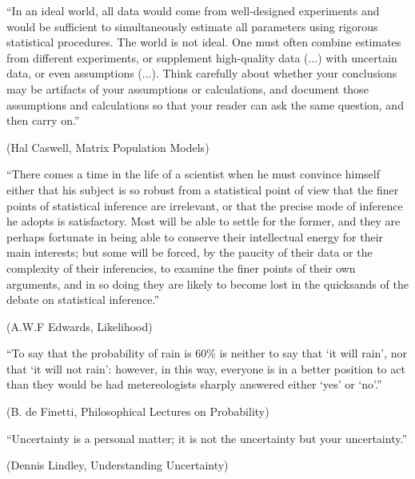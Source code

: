 
\cleardoublepage
\null
\vfill

``In an ideal world, all data would come from well-designed experiments
and would be sufficient to simultaneously estimate all parameters using rigorous
statistical procedures. The world is not ideal. One must often combine estimates
from different experiments, or supplement high-quality data (...) with uncertain
data, or even assumptions (...). Think carefully about whether your conclusions
may be artifacts of your assumptions or calculations, and document those assumptions
and calculations so that your reader can ask the same question, and then carry on.''
\begin{flushright}
(Hal Caswell, Matrix Population Models)
\end{flushright}

\vfill

``There comes a time in the life of a scientist when he must convince himself
either that his subject is so robust from a statistical point of view that
the finer points of statistical inference are irrelevant, or that the precise
mode of inference he adopts is satisfactory. Most will be able to settle for
the former, and they are perhaps fortunate in being able to conserve their
intellectual energy for their main interests; but some will be forced, by the
paucity of their data or the complexity of their inferencies, to examine
the finer points of their own arguments, and in so doing they are likely
to become lost in the quicksands of the debate on statistical inference.''
\begin{flushright}
(A.W.F Edwards, Likelihood)
\end{flushright}

\vfill

``To say that the probability of rain is 60\% is neither to say that
`it will rain', nor that `it will not rain': however, in this way,
everyone is in a better position to act than they would be had
metereologists sharply answered either `yes' or `no'.''
\begin{flushright}
(B. de Finetti, Philosophical Lectures on Probability)
\end{flushright}

\vfill

``Uncertainty is a personal matter; it is not the uncertainty but your uncertainty.''
\begin{flushright}
(Dennis Lindley, Understanding Uncertainty)
\end{flushright}
\vfill

\cleardoublepage
